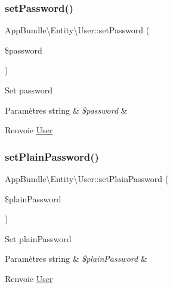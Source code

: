 \subsubsection{\texorpdfstring{set\+Password()}{setPassword()}}
{\footnotesize\ttfamily App\+Bundle\textbackslash{}\+Entity\textbackslash{}\+User\+::set\+Password (\begin{DoxyParamCaption}\item[{}]{\$password }\end{DoxyParamCaption})}

Set password


\begin{DoxyParams}[1]{Paramètres}
string & {\em \$password} & \\
\hline
\end{DoxyParams}
\begin{DoxyReturn}{Renvoie}
\hyperlink{classAppBundle_1_1Entity_1_1User}{User} 
\end{DoxyReturn}
\mbox{\label{classAppBundle_1_1Entity_1_1User_abfd09d2156ac2c22b69a04690fd6977c}} 
\subsubsection{\texorpdfstring{set\+Plain\+Password()}{setPlainPassword()}}
{\footnotesize\ttfamily App\+Bundle\textbackslash{}\+Entity\textbackslash{}\+User\+::set\+Plain\+Password (\begin{DoxyParamCaption}\item[{}]{\$plain\+Password }\end{DoxyParamCaption})}

Set plain\+Password


\begin{DoxyParams}[1]{Paramètres}
string & {\em \$plain\+Password} & \\
\hline
\end{DoxyParams}
\begin{DoxyReturn}{Renvoie}
\hyperlink{classAppBundle_1_1Entity_1_1User}{User} 
\end{DoxyReturn}
\mbox{\label{classAppBundle_1_1Entity_1_1User_a9a31aabdc1f483e3fab33c4c4d52b503}} 
